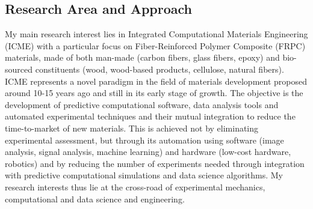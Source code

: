 \documentclass[
  a4paper, 
]{fortysecondscv}
\begin{document}
\makefrontsidebar

\subsection{Research Area and Approach}
My main research interest lies in Integrated Computational Materials Engineering (ICME) with a particular focus on Fiber-Reinforced Polymer Composite (FRPC) materials, made of both man-made (carbon fibers, glass fibers, epoxy) and bio-sourced constituents (wood, wood-based products, cellulose, natural fibers). ICME represents a novel paradigm in the field of materials development proposed around 10-15 years ago and still in its early stage of growth. The objective is the development of predictive computational software, data analysis tools and automated experimental techniques and their mutual integration to reduce the time-to-market of new materials. This is achieved not by eliminating experimental assessment, but through its automation using software (image analysis, signal analysis, machine learning) and hardware (low-cost hardware, robotics) and by reducing the number of experiments needed through integration with predictive computational simulations and data science algorithms. My research interests thus lie at the cross-road of experimental mechanics, computational and data science and engineering. 
\end{document}
